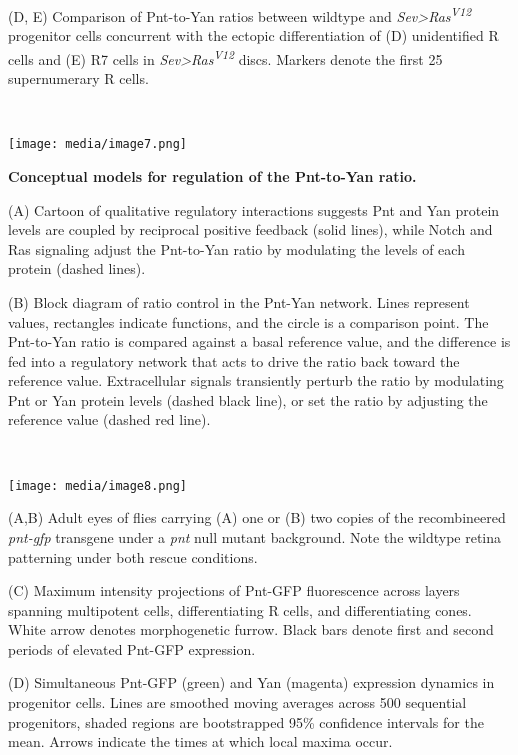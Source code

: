(D, E) Comparison of Pnt-to-Yan ratios between wildtype and \emph{Sev\textgreater{}Ras\textsuperscript{V12}} progenitor cells concurrent with the ectopic differentiation of (D) unidentified R cells and (E) R7 cells in \emph{Sev\textgreater{}Ras\textsuperscript{V12}} discs. Markers denote the first 25 supernumerary R cells.

\textbf{\\
}

\texttt{[image: media/image7.png]}

\textbf{Conceptual models for regulation of the Pnt-to-Yan ratio. }

(A) Cartoon of qualitative regulatory interactions suggests Pnt and Yan protein levels are coupled by reciprocal positive feedback (solid lines), while Notch and Ras signaling adjust the Pnt-to-Yan ratio by modulating the levels of each protein (dashed lines).

(B) Block diagram of ratio control in the Pnt-Yan network. Lines represent values, rectangles indicate functions, and the circle is a comparison point. The Pnt-to-Yan ratio is compared against a basal reference value, and the difference is fed into a regulatory network that acts to drive the ratio back toward the reference value. Extracellular signals transiently perturb the ratio by modulating Pnt or Yan protein levels (dashed black line), or set the ratio by adjusting the reference value (dashed red line).

\textbf{\\
}

\texttt{[image: media/image8.png]}

(A,B) Adult eyes of flies carrying (A) one or (B) two copies of the recombineered \emph{pnt-gfp} transgene under a \emph{pnt} null mutant background. Note the wildtype retina patterning under both rescue conditions.

(C) Maximum intensity projections of Pnt-GFP fluorescence across layers spanning multipotent cells, differentiating R cells, and differentiating cones. White arrow denotes morphogenetic furrow. Black bars denote first and second periods of elevated Pnt-GFP expression.

(D) Simultaneous Pnt-GFP (green) and Yan (magenta) expression dynamics in progenitor cells. Lines are smoothed moving averages across 500 sequential progenitors, shaded regions are bootstrapped 95\% confidence intervals for the mean. Arrows indicate the times at which local maxima occur.

